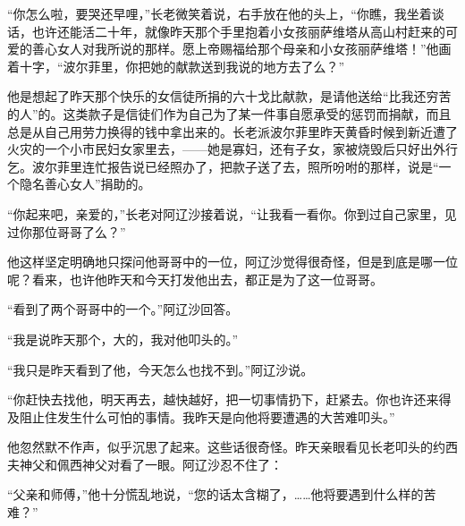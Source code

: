 \par “你怎么啦，要哭还早哩，”长老微笑着说，右手放在他的头上，“你瞧，我坐着谈话，也许还能活二十年，就像昨天那个手里抱着小女孩丽萨维塔从高山村赶来的可爱的善心女人对我所说的那样。愿上帝赐福给那个母亲和小女孩丽萨维塔！”他画着十字，“波尔菲里，你把她的献款送到我说的地方去了么？”
\par 他是想起了昨天那个快乐的女信徒所捐的六十戈比献款，是请他送给“比我还穷苦的人”的。这类款子是信徒们作为自己为了某一件事自愿承受的惩罚而捐献，而且总是从自己用劳力换得的钱中拿出来的。长老派波尔菲里昨天黄昏时候到新近遭了火灾的一个小市民妇女家里去，——她是寡妇，还有子女，家被烧毁后只好出外行乞。波尔菲里连忙报告说已经照办了，把款子送了去，照所吩咐的那样，说是“一个隐名善心女人”捐助的。
\par “你起来吧，亲爱的，”长老对阿辽沙接着说，“让我看一看你。你到过自己家里，见过你那位哥哥了么？”
\par 他这样坚定明确地只探问他哥哥中的一位，阿辽沙觉得很奇怪，但是到底是哪一位呢？看来，也许他昨天和今天打发他出去，都正是为了这一位哥哥。
\par “看到了两个哥哥中的一个。”阿辽沙回答。
\par “我是说昨天那个，大的，我对他叩头的。”
\par “我只是昨天看到了他，今天怎么也找不到。”阿辽沙说。
\par “你赶快去找他，明天再去，越快越好，把一切事情扔下，赶紧去。你也许还来得及阻止住发生什么可怕的事情。我昨天是向他将要遭遇的大苦难叩头。”
\par 他忽然默不作声，似乎沉思了起来。这些话很奇怪。昨天亲眼看见长老叩头的约西夫神父和佩西神父对看了一眼。阿辽沙忍不住了：
\par “父亲和师傅，”他十分慌乱地说，“您的话太含糊了，……他将要遇到什么样的苦难？”
